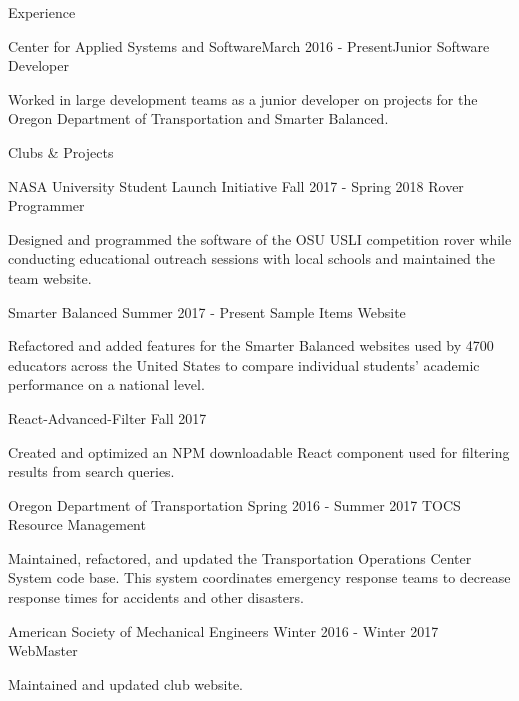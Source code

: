 \documentclass{resume} %
\begin{document}
\begin{rSection}{Experience}

  \begin{rSubsection}{Center for Applied Systems and Software}{March 2016 - Present}{Junior Software Developer}{}
  \item Worked in large development teams as a junior developer on projects for the Oregon  Department of Transportation and Smarter Balanced.
  \end{rSubsection}

\end{rSection}


\begin{rSection}{Clubs \& Projects}
  
    
  \begin{rSubsection} {NASA University Student Launch Initiative} {Fall 2017 - Spring 2018} {Rover Programmer} {}
  \item Designed and programmed the software of the OSU USLI competition rover while conducting educational outreach sessions with local schools and maintained the team website.
  \end{rSubsection}

  \begin{rSubsection} {Smarter Balanced} {Summer 2017 - Present} {Sample Items Website} {}
  \item Refactored and added features for the Smarter Balanced websites used by 4700 educators across the United States to compare individual students' academic performance on a national level.
  \end{rSubsection}

  \begin{rSubsection} {React-Advanced-Filter} {Fall 2017} {} {}
  \item Created and optimized an NPM downloadable React component used for filtering results from search queries.
  \end{rSubsection}

  \begin{rSubsection} {Oregon Department of Transportation} {Spring 2016 - Summer 2017} {TOCS Resource Management} {}
  \item Maintained, refactored, and updated the Transportation Operations Center System code base. This system coordinates emergency response teams to decrease response times for accidents and other disasters.
  \end{rSubsection}

  \begin{rSubsection} {American Society of Mechanical Engineers} {Winter 2016 - Winter 2017} {WebMaster} {}
  \item Maintained and updated club website.
  \end{rSubsection}

\end{rSection}
\end{document}
